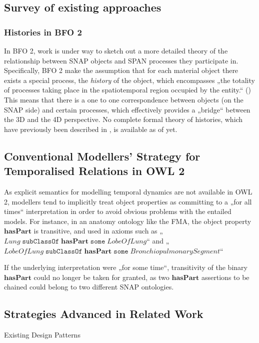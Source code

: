 \documentclass[10pt]{bmc_article}
\newcommand{\mirel}[1]{\ensuremath{\mathrm{\mathbf{#1}}}}
\newcommand{\mclass}[1]{\ensuremath{\mathit{#1}}}
\newenvironment{bmcformat}{\baselineskip20pt\sloppy\setboolean{publ}{false}}{\baselineskip20pt\sloppy}
\begin{document}
\begin{bmcformat}
\subsection*{Survey of existing approaches}

\subsubsection*{Histories in BFO 2}

In BFO 2, work is under way to sketch out a more detailed theory of the
relationship between SNAP objects and SPAN processes they participate in.
Specifically, BFO 2 make the assumption that for each material object there
exists a special process, the \emph{history} of the object, which encompasses 
„the totality of processes taking place in the spatiotemporal region occupied by
the entity.“ (\cite{BFO2:ref}) This means that there is a one to one correspondence
between objects (on the SNAP side) and certain processes, which effectively
provides a „bridge“ between the 3D and the 4D perspective. No complete formal theory
of histories, which have previously been described in \cite{cornucopia}, is available as of yet.
\subsection{Conventional Modellers’ Strategy for Temporalised Relations in OWL 2}

As explicit semantics for modelling temporal dynamics are not available in OWL
2, modellers tend to implicitly treat object properties as committing to a 
„for all times“ interpretation in order to avoid obvious problems with the
entailed models. For instance, in an anatomy ontology like the FMA, the object
property \mirel{hasPart} is transitive, and used in axioms such as
„$\mclass{Lung}\;\mathtt{subClassOf}\;\mirel{hasPart}\;\mathtt{some}\;\mclass{LobeOfLung}$“
and „$\mclass{LobeOfLung}\;\mathtt{subClassOf}\;\mirel{hasPart}\;\mathtt{some}\;\mclass{BronchiopulmonarySegment}$“

If the underlying interpretation were „for some time“, transitivity of the
binary \mirel{hasPart} could no longer be taken for granted, as two
\mirel{hasPart} assertions to be chained could belong to two different SNAP
ontologies.

\subsection*{Strategies Advanced in Related Work}
Existing Design Patterns


\end{bmcformat}
\end{document}
